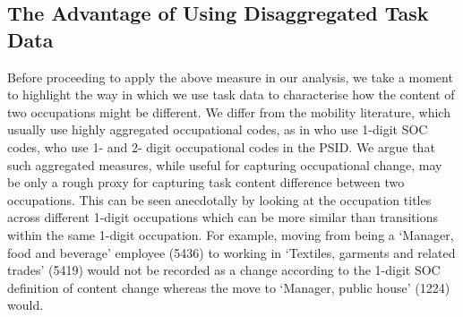 \documentclass[12pt,authoryear]{elsarticle}
\begin{document}
	
	

	
	
	\subsection{The Advantage of Using  Disaggregated Task Data}
	\label{sec:advantageTasks}
	Before proceeding to apply the above measure in our analysis, we take a moment to highlight the way in which we use task data to characterise how the content of two occupations might be different. We differ from the mobility literature, which usually use highly aggregated occupational codes, as in \cite{Carrillo-Tudela2016} who use 1-digit SOC codes, \cite{kambourov2009occupational} who use 1- and 2- digit occupational codes in the PSID. We argue that such aggregated measures, while useful for capturing occupational change, may be only a rough proxy for capturing task content difference between two occupations. This can be seen anecdotally by looking at the occupation titles across different 1-digit occupations which can be more similar than transitions within the same 1-digit occupation. For example, moving from being a `Manager, food and beverage' employee (5436) to working in `Textiles, garments and related trades' (5419) would not be recorded as a change according to the 1-digit SOC definition of content change whereas the move to `Manager, public house' (1224) would. 
	
	\vspace{2mm}
	
\end{document}
